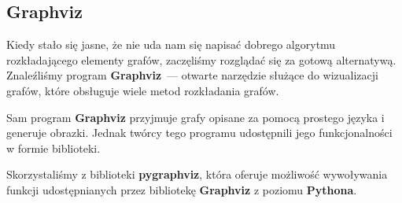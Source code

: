 \subsection{Graphviz}
Kiedy stało się jasne, że nie uda nam się napisać dobrego algorytmu rozkładającego elementy grafów, zaczęliśmy rozglądać się za gotową alternatywą.
Znaleźliśmy program \textbf{Graphviz}~--- otwarte narzędzie służące do wizualizacji grafów, które obsługuje wiele metod rozkładania grafów.

Sam program \textbf{Graphviz} przyjmuje grafy opisane za pomocą prostego języka i generuje obrazki.
Jednak twórcy tego programu udostępnili jego funkcjonalności w formie biblioteki.

Skorzystaliśmy z biblioteki \textbf{pygraphviz}, która oferuje możliwość wywoływania funkcji udostępnianych przez bibliotekę \textbf{Graphviz} z poziomu \textbf{Pythona}.
